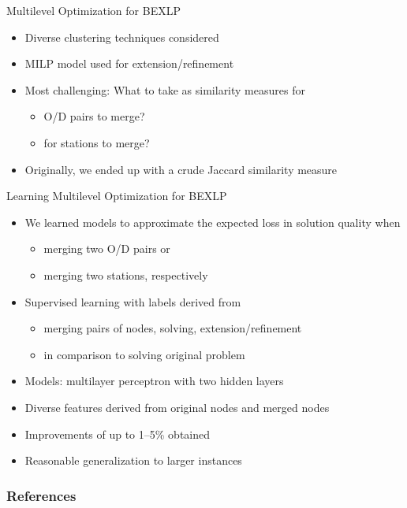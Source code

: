 \documentclass[aspectratio=1610]{beamer}
\newcommand{\important}[1]{{\color{green!60!black}#1}}
\begin{document}
\begin{frame}{Multilevel Optimization for BEXLP}
\begin{itemize}
	\itemsep3ex
	\item Diverse clustering techniques considered
	\item MILP model used for extension/refinement
	\item Most challenging: What to take as \important{similarity measures} for
	\begin{itemize}
		\item O/D pairs to merge?
		\item for stations to merge?
	\end{itemize}
	\item Originally, we ended up with a crude Jaccard similarity measure
\end{itemize}
\end{frame}

\begin{frame}{Learning Multilevel Optimization for BEXLP}
	\citep{tomandl-24}

	\bigskip
	\begin{itemize}
		\itemsep2ex
		\item We \important{learned models to approximate the expected loss in solution quality} when
		\begin{itemize}
			\item merging two O/D pairs or 
			\item merging two stations, respectively
		\end{itemize} 
		\item Supervised learning with labels derived from
		\begin{itemize}
			\item merging pairs of nodes, solving, extension/refinement
			\item in comparison to solving original problem
		\end{itemize} 
		\item Models: multilayer perceptron with two hidden layers
		\item Diverse features derived from original nodes and merged nodes
		\item \important{Improvements of up to 1--5\% obtained}
		\item \important{Reasonable generalization to larger instances}
	\end{itemize}
\end{frame}








\begin{frame}[allowframebreaks]
	\frametitle{References}
	\small
	
\end{frame}
\end{document}
